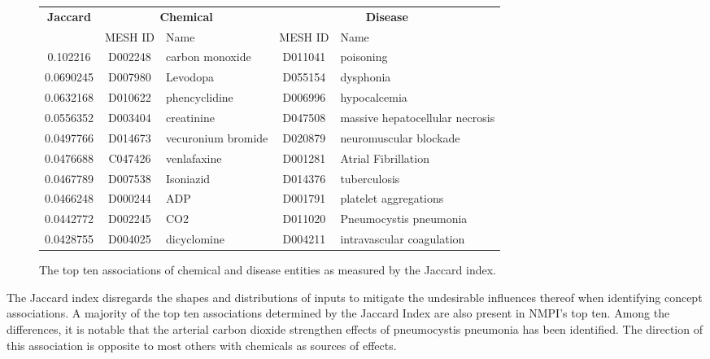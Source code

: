 \documentclass[10pt, oneside]{article}
\begin{document}
\begin{figure}[h]
\begin{center}
\fontsize{9}{11}\selectfont
\begin{tabular}{|*{2}{c|}p{4.5cm}|c|p{4.5cm}|}\hline
 \multirow{2}{*}{\textbf{Jaccard}} & \multicolumn{2}{c|}{\textbf{Chemical}} & \multicolumn{2}{c|}{\textbf{Disease}} \\ \cline{2-5}
 & MESH ID   & Name                      & MESH ID   & Name                         \\ \hline
       0.102216  & D002248   & carbon monoxide    & D011041   & poisoning                       \\ \hline
       0.0690245 & D007980   & Levodopa           & D055154   & dysphonia                       \\ \hline
       0.0632168 & D010622   & phencyclidine      & D006996   & hypocalcemia                    \\ \hline
       0.0556352 & D003404   & creatinine         & D047508   & massive hepatocellular necrosis \\ \hline
       0.0497766 & D014673   & vecuronium bromide & D020879   & neuromuscular blockade          \\ \hline
       0.0476688 & C047426   & venlafaxine        & D001281   & Atrial Fibrillation             \\ \hline
       0.0467789 & D007538   & Isoniazid          & D014376   & tuberculosis                    \\ \hline
       0.0466248 & D000244   & ADP                & D001791   & platelet aggregations           \\ \hline
       0.0442772 & D002245   & CO2                & D011020   & Pneumocystis pneumonia          \\ \hline
       0.0428755 & D004025   & dicyclomine        & D004211   & intravascular coagulation       \\ \hline
\end{tabular}
\caption{\label{fig:jaccard} The top ten associations of chemical and disease entities as measured by the Jaccard index.}
\end{center}
\end{figure}

The Jaccard index disregards the shapes and distributions of inputs \cite{leydesdorff2008normalization} to mitigate the undesirable influences thereof when identifying concept associations. A majority of the top ten associations determined by the Jaccard Index are also present in NMPI's top ten. Among the differences, it is notable that the arterial carbon dioxide strengthen effects of pneumocystis pneumonia \cite{bouma2009normalized} has been identified. The direction of this association is opposite to most others with chemicals as sources of effects.
\end{document}

